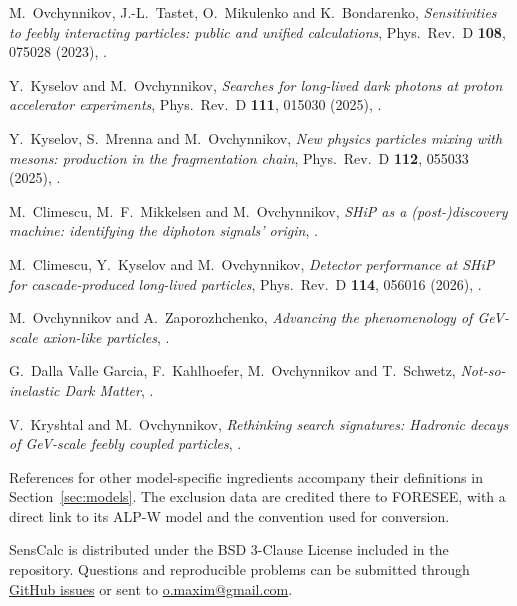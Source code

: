 \begin{enumerate}[label={[\arabic*]},itemsep=4pt]
\item M.~Ovchynnikov, J.-L.~Tastet, O.~Mikulenko and K.~Bondarenko, \emph{Sensitivities to feebly interacting particles: public and unified calculations}, Phys.~Rev.~D \textbf{108}, 075028 (2023), .
\item Y.~Kyselov and M.~Ovchynnikov, \emph{Searches for long-lived dark photons at proton accelerator experiments}, Phys.~Rev.~D \textbf{111}, 015030 (2025), .
\item Y.~Kyselov, S.~Mrenna and M.~Ovchynnikov, \emph{New physics particles mixing with mesons: production in the fragmentation chain}, Phys.~Rev.~D \textbf{112}, 055033 (2025), .
\item M.~Climescu, M.~F.~Mikkelsen and M.~Ovchynnikov, \emph{SHiP as a (post-)discovery machine: identifying the diphoton signals' origin}, .
\item M.~Climescu, Y.~Kyselov and M.~Ovchynnikov, \emph{Detector performance at SHiP for cascade-produced long-lived particles}, Phys.~Rev.~D \textbf{114}, 056016 (2026), .
\item M.~Ovchynnikov and A.~Zaporozhchenko, \emph{Advancing the phenomenology of GeV-scale axion-like particles}, .
\item G.~Dalla Valle Garcia, F.~Kahlhoefer, M.~Ovchynnikov and T.~Schwetz, \emph{Not-so-inelastic Dark Matter}, .
\item V.~Kryshtal and M.~Ovchynnikov, \emph{Rethinking search signatures: Hadronic decays of GeV-scale feebly coupled particles}, .
\end{enumerate}

References for other model-specific ingredients accompany their definitions in Section~\ref{sec:models}. The  exclusion data are credited there to FORESEE, with a direct link to its ALP-W model and the convention used for conversion.

SensCalc is distributed under the BSD 3-Clause License included in the repository. Questions and reproducible problems can be submitted through \href{https://github.com/maksymovchynnikov/SensCalc/issues}{GitHub issues} or sent to \href{mailto:o.maxim@gmail.com}{o.maxim@gmail.com}.
